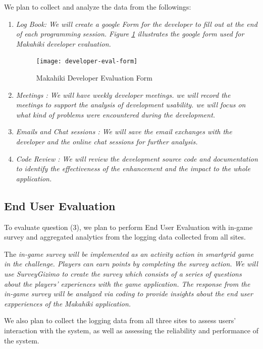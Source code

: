 \documentclass[11pt]{article}
\begin{document}
We plan to collect and analyze the data from the followings:
\begin{enumerate}
\item \em Log Book\em: We will create a google Form for the developer to fill out at the end of each programming session. Figure \ref{fig:developer-eval-form} illustrates the google form used for Makahiki developer evaluation.

\begin{figure}[ht!]
   \centering
   \texttt{[image: developer-eval-form]}
   \caption{Makahiki Developer Evaluation Form}
   \label{fig:developer-eval-form}
\end{figure}
 
\item \em Meetings \em: We will have weekly developer meetings. we will record the meetings to support the analysis of development usability. we will focus on what kind of problems were encountered during the development.

\item \em Emails and Chat sessions \em: We will save the email exchanges with the developer and the online chat sessions for further analysis.

\item \em Code Review \em: We will review the development source code and documentation to identify the effectiveness of the enhancement and the impact to the whole application.

\end{enumerate}

\subsection{End User Evaluation}
To evaluate question (3), we plan to perform End User Evaluation with in-game survey and aggregated analytics from the logging data collected from all sites.

The \em in-game survey \em will be implemented as an activity action in smartgrid game in the challenge. Players can earn points by completing the survey action. We will use SurveyGizimo to create the survey which consists of a series of questions about the players' experiences with the game application. The response from the in-game survey will be analyzed via coding to provide insights about the end user expperiences of the Makahiki application.

We also plan to collect the logging data from all three sites to assess users' interaction with the system, as well as assessing the reliability and performance of the system.
\end{document}
